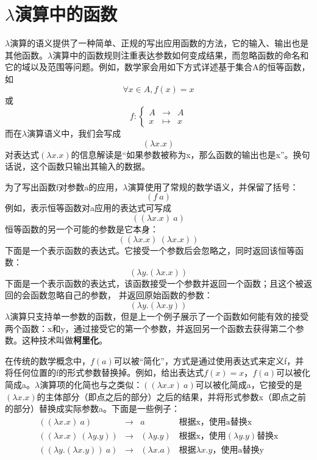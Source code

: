 \documentclass{book}
\begin{document}
\section{$\lambda$演算中的函数}
$\lambda$演算的语义提供了一种简单、正规的写出应用函数的方法，它的输入、输出也是其他函数。$\lambda$演算中的函数规则注重表达参数如何变成结果，而忽略函数的命名和它的域以及范围等问题。例如，数学家会用如下方式详述基于集合A的恒等函数，如
$$
\forall x\in A, f(x) = x
$$
或
$$
    f:\left\{
\begin{array}{lcl}
A & \longrightarrow & A \\
x & \mapsto & x
\end{array}
\right.
$$
而在$\lambda$演算语义中，我们会写成
$$
(\lambda x.x)
$$
对表达式$(\lambda x.x)$的信息解读是“如果参数被称为x，那么函数的输出也是x”。换句话说，这个函数只输出其输入的数据。\par
为了写出函数f对参数a的应用，$\lambda$演算使用了常规的数学语义，并保留了括号：
$$
(f\ a)
$$
例如，表示恒等函数对a应用的表达式可写成
$$((\lambda x.x)\ a)$$
恒等函数的另一个可能的参数是它本身：
$$((\lambda x.x)\ (\lambda x.x))$$
下面是一个表示函数的表达式。它接受一个参数后会忽略之，同时返回该恒等函数：
$$(\lambda y.(\lambda x.x))$$
下面是一个表示函数的表达式，该函数接受一个参数并返回一个函数；且这个被返回的会函数忽略自己的参数， 并返回原始函数的参数：
$$(\lambda y.(\lambda x.y))$$
$\lambda$演算只支持单一参数的函数，但是上一个例子展示了一个函数如何能有效的接受两个函数：x和y，通过接受它的第一个参数，并返回另一个函数去获得第二个参数。这种技术叫做\textbf{柯里化}。\par
在传统的数学概念中，$f(a)$可以被“简化”，方式是通过使用表达式来定义f，并将任何位置的f的形式参数替换掉。例如，给出表达式$f(x) = x$，$f(a)$可以被化简成a。$\lambda$演算项的化简也与之类似：$((\lambda x.x)\ a)$可以被化简成a，它接受的是$(\lambda x.x)$的主体部分（即点之后的部分）之后的结果，并将形式参数x（即点之前的部分）替换成实际参数a。下面是一些例子：
$$
\begin{array}{llll}
((\lambda x.x)\ a) & \rightarrow & a & \text{根据x，使用a替换x} \\
((\lambda x.x)\ (\lambda y.y)) & \rightarrow & (\lambda y.y) & \text{根据x，使用$(\lambda y.y)$替换x}\\
((\lambda y.(\lambda x.y))\ a) & \rightarrow & (\lambda x.a) & \text{根据$\lambda x.y$，使用a替换y}
\end{array}
$$
\end{document}
